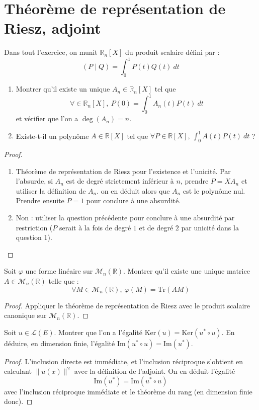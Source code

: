 \documentclass[french,a4paper]{article}
\newcommand{\R}{\mathbb{R}}
\newcommand{\st}{^*}
\newcommand{\im}{\text{Im}}
\newcommand{\Tr}{\text{Tr}}
\theoremstyle{plain}
\theoremstyle{definition}
\theoremstyle{remark}
\begin{document}
\section{Théorème de représentation de Riesz, adjoint}

\begin{ex}{}
	Dans tout l'exercice, on munit $\R_n[X]$ du produit scalaire défini par : $$(P\mid Q)=\int_{0}^{1}P(t)Q(t)\ dt$$
	\begin{enumerate}
		\item Montrer qu'il existe un unique $A_n\in\R_n[X]$ tel que $$\forall \in\R_n[X],\ P(0)=\int_{0}^{1}A_n(t)P(t)\ dt$$ et vérifier que l'on a $\deg(A_n)=n$.
		\item Existe-t-il un polynôme $A\in\R[X]$ tel que $\forall P\in\R[X],\ \displaystyle\int_{0}^{1}A(t)P(t)\ dt$ ?
	\end{enumerate}
\end{ex}
\begin{proof}
	\begin{enumerate}
		\item Théorème de représentation de Riesz pour l'existence et l'unicité. Par l'absurde, si $A_n$ est de degré strictement inférieur à $n$, prendre $P=XA_n$ et utiliser la définition de $A_n$. on en déduit alors que $A_n$ est le polynôme nul. Prendre ensuite $P=1$ pour conclure à une absurdité.
		\item Non : utiliser la question précédente pour conclure à une absurdité par restriction ($P$ serait à la fois de degré $1$ et de degré $2$ par unicité dans la question 1).
	\end{enumerate}
\end{proof}

\begin{ex}{}
	Soit $\varphi$ une forme linéaire sur $\mathcal{M}_n(\R)$. Montrer qu'il existe une unique matrice $A\in\mathcal{M}_n(\R)$ telle que : $$\forall M\in\mathcal{M}_n(\R),\ \varphi(M)=\Tr(AM)$$
\end{ex}
\begin{proof}
	Appliquer le théorème de représentation de Riesz avec le produit scalaire canonique sur $\mathcal{M}_n(\R)$.
\end{proof}

\begin{ex}{}
	Soit $u\in\mathcal{L}(E)$. Montrer que l'on a l'égalité $\text{Ker}(u)=\text{Ker}(u\st\circ u)$. En déduire, en dimension finie, l'égalité $\im(u\st\circ u)=\im(u\st)$.
\end{ex}
\begin{proof}
	L'inclusion directe est immédiate, et l'inclusion réciproque s'obtient en calculant $\lVert u(x)\rVert^2$ avec la définition de l'adjoint. On en déduit l'égalité $$\text{Im}(u\st)=\text{Im}(u\st\circ u)$$ avec l'inclusion réciproque immédiate et le théorème du rang (en dimension finie donc).
\end{proof}
\end{document}
